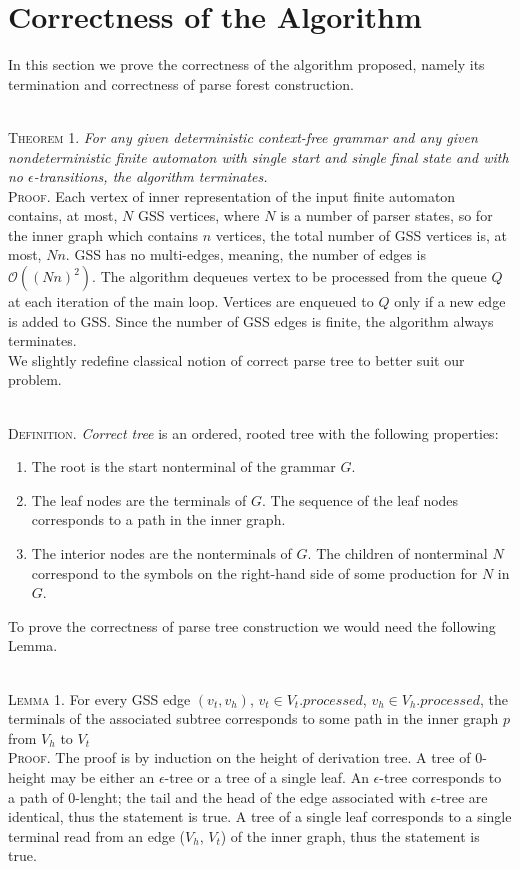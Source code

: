 \section{Correctness of the Algorithm}
In this section we prove the correctness of the algorithm proposed, namely its termination 
and correctness of parse forest construction.

~\\
\textsc{Theorem 1.}
\textit{For any given deterministic context-free grammar and any given nondeterministic
finite automaton with single start and single final state and with no $\epsilon$-transitions,
the algorithm terminates.}
~\\
\textsc{Proof.}
Each vertex of inner representation of the input finite automaton contains, at most, 
$N$ GSS vertices, where $N$ is a number of parser states, so for the inner graph which contains $n$
vertices, the total number of GSS vertices is, at most, $Nn$. GSS has no multi-edges,  
meaning, the number of edges is $\mathcal{O}((Nn)^2)$. 
The algorithm dequeues vertex to be processed from the queue $Q$ at each iteration of the 
main loop. Vertices are enqueued to $Q$ only if a new edge is added to GSS. Since the number of 
GSS edges is finite, the algorithm always terminates. 
~\\

We slightly redefine classical notion of correct parse tree to better suit our problem.

~\\
\textsc{Definition.} 
\emph{Correct tree} is an ordered, rooted tree with the following properties:
\begin{enumerate}
  \item The root is the start nonterminal of the grammar $G$.
  \item The leaf nodes are the terminals of $G$. The sequence of the leaf nodes 
        corresponds to a path in the inner graph. 
  \item The interior nodes are the nonterminals of $G$. The children of nonterminal 
        $N$ correspond to the symbols on the right-hand side of some production for $N$ in $G$.
\end{enumerate}

To prove the correctness of parse tree construction we would need the following Lemma.

~\\
\textsc{Lemma 1.}
For every GSS edge $(v_{t}, v_{h})$, $v_{t} \in V_{t}.processed$, $v_{h} \in V_{h}.processed$, 
the terminals of the associated subtree corresponds to some path in the inner graph $p$ from $V_{h}$ to $V_{t}$
~\\
\textsc{Proof.}
The proof is by induction on the height of derivation tree. 
A tree of 0-height may be either an $\epsilon$-tree or a tree of a single leaf.
An $\epsilon$-tree corresponds to a path of 0-lenght; the tail and the head of the edge associated with 
$\epsilon$-tree are identical, thus the statement is true. A tree of a single leaf corresponds to a single 
terminal read from an edge ($V_{h}$, $V_{t}$) of the inner graph, thus the statement is true.

